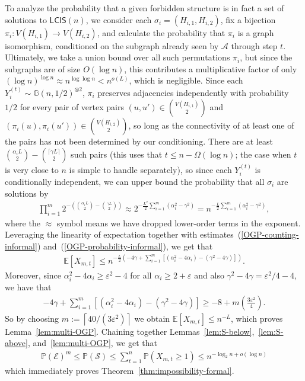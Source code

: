 \documentclass[11pt]{article}
\theoremstyle{plain}
\theoremstyle{definition}
\theoremstyle{remark}
\newcommand{\Gnhalf}{\mathbb{G}(n,1/2)}
\newcommand{\E}{\mathbb{E}}
\newcommand{\eps}{\varepsilon}
\newcommand{\MCS}{\mathsf{LCIS}}
\newcommand{\Alg}{\mathcal{A}}
\newcommand{\findOneLarge}{\mathcal{E}}
\newcommand{\findManyLarge}{\mathcal{S}}
\renewcommand{\Pr}{\mathbb{P}}
\begin{document}
To analyze the probability that a given forbidden structure is in fact a set of solutions to $\MCS(n)$, we consider each $\sigma_i = (H_{i,1}, H_{i,2})$, fix a bijection $\pi_i: V(H_{i,1}) \to V(H_{i,2})$, and calculate the probability that $\pi_i$ is a graph isomorphism, conditioned on the subgraph already seen by $\Alg$ through step $t$. Ultimately, we  take a union bound over all such permutations $\pi_i$, but since the subgraphs are of size $O(\log n)$, this contributes a multiplicative factor of only $(\log n)^{\log n} \approx n^{\log \log n} < n^{o(L)}$, which is negligible. 
Since each $Y_i^{(t)} \sim \Gnhalf^{\otimes 2}$, $\pi_i$ preserves adjacencies independently with probability $1/2$ for every pair of vertex pairs $(u, u') \in \binom{V(H_{i,1})}{2}$ and $(\pi_i(u), \pi_i(u')) \in \binom{V(H_{i,2})}{2}$, so long as the connectivity of at least one of the pairs has not been determined by our conditioning. There are at least $\binom{\alpha_i L}{2} - \binom{\lceil \gamma L\rceil}{2}$ such pairs (this uses that $t \leq n - \Omega(\log n)$; the case when $t$ is very close to $n$ is simple to handle separately), so since each $Y_i^{(t)}$ is conditionally independent, we can upper bound the probability that all $\sigma_i$ are solutions by
\begin{align}
    \prod_{i=1}^m 2^{-\left(\binom{\alpha_i L}{2} - \binom{\gamma L}{2}\right)} \approx 2^{-\frac{L^2}{2}\sum_{i=1}^m\left(\alpha_i^2 - \gamma^2\right)} = n^{-\frac{L}{2}\sum_{i=1}^m\left(\alpha_i^2 - \gamma^2\right)}, \label{OGP-probability-informal}
\end{align}
where the $\approx$ symbol means we have dropped lower-order terms in the exponent. Leveraging the linearity of expectation together with estimates~(\ref{OGP-counting-informal}) and~(\ref{OGP-probability-informal}), we get that
\begin{align*}
    \E[X_{m,t}] \leq n^{-\frac L 2\left(-4\gamma + \sum_{i=1}^m\left[(\alpha_i^2 - 4\alpha_i) - (\gamma^2 - 4\gamma)\right]\right)}. %
\end{align*}
Moreover, since $\alpha_i^2 - 4\alpha_i \geq \eps^2 - 4$ for all $\alpha_i \geq 2 + \eps$ and also $\gamma^2 - 4\gamma = \eps^2/4 -4$, we have that 
\begin{align*}
    -4\gamma + \sum_{i=1}^m\left[(\alpha_i^2 - 4\alpha_i) - (\gamma^2 - 4\gamma)\right] \geq -8 + m\left(\frac{3\eps^2}{4}\right).
\end{align*}
So by choosing $m := \left\lceil 40/(3\eps^2) \right\rceil$ we obtain $\E[X_{m,t}] \leq n^{-L}$, which proves Lemma~\ref{lem:multi-OGP}. Chaining together Lemmas~\ref{lem:S-below},~\ref{lem:S-above}, and~\ref{lem:multi-OGP}, we get that
\begin{align}
    \Pr(\findOneLarge)^m \leq \Pr(\findManyLarge) \leq \sum_{t=1}^{n} \Pr(X_{m,t} \geq 1) \leq n^{-\log_2 n + o(\log n)}
\end{align}
which immediately proves Theorem~\ref{thm:impossibility-formal}.
\end{document}
